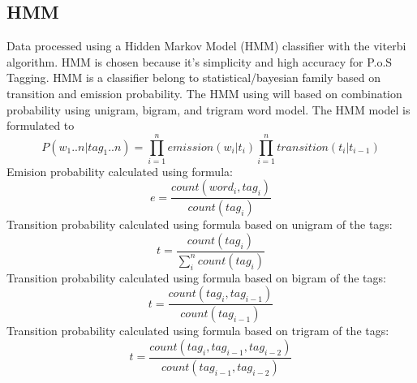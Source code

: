 \documentclass[conference,compsoc]{IEEEtran}
\begin{document}
\subsection{HMM}
Data processed using a Hidden Markov Model (HMM) classifier with the viterbi algorithm. HMM is chosen because it's simplicity and high accuracy for P.o.S Tagging\cite{HMM:1,HMM:2}. HMM is a classifier belong to statistical/bayesian family based on transition and emission probability. The HMM using will based on combination probability using unigram, bigram, and trigram word model. The HMM model is formulated to
\[ P(w_1..n|tag_1..n) = \prod_{i=1}^n emission(w_i|t_i) \prod_{i=1}^n transition(t_i|t_{i-1}) \]
Emision probability calculated using formula:
\[ e = \frac{count(word_i, tag_i)}{count(tag_i)} \]
Transition probability calculated using formula based on unigram of the tags:
\[ t = \frac{count(tag_i)}{\sum_i^n count(tag_i)} \]
Transition probability calculated using formula based on bigram of the tags:
\[ t = \frac{count(tag_i,tag_{i-1})}{count(tag_{i-1})} \]
Transition probability calculated using formula based on trigram of the tags:
\[ t = \frac{count(tag_i,tag_{i-1},tag_{i-2})}{count(tag_{i-1},tag_{i-2})} \]
\end{document}
